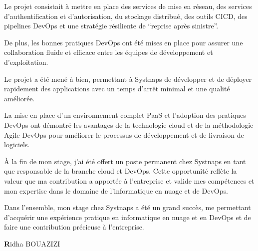 Le projet consistait à mettre en place des services de mise en réseau, des services d'authentification et d'autorisation, du stockage distribué, des outils CICD, des pipelines DevOps et une stratégie résiliente de “reprise après sinistre”. 

De plus, les bonnes pratiques DevOps ont été mises en place pour assurer une collaboration fluide et efficace entre les équipes de développement et d'exploitation. 

Le projet a été mené à bien, permettant à Systnaps de développer et de déployer rapidement des applications avec un temps d'arrêt minimal et une qualité améliorée. 

La mise en place d'un environnement complet PaaS et l'adoption des pratiques DevOps ont démontré les avantages de la technologie cloud et de la méthodologie Agile DevOps pour améliorer le processus de développement et de livraison de logiciels. 

À la fin de mon stage, j'ai été offert un poste permanent chez Systnaps en tant que responsable de la branche cloud et DevOps. Cette opportunité reflète la valeur que ma contribution a apportée à l'entreprise et valide mes compétences et mon expertise dans le domaine de l'informatique en nuage et de DevOps. 

Dans l'ensemble, mon stage chez Systnaps a été un grand succès, me permettant d'acquérir une expérience pratique en informatique en nuage et en DevOps et de faire une contribution précieuse à l'entreprise.


\begin{flushright}
\textbf Ridha BOUAZIZI
\end{flushright}